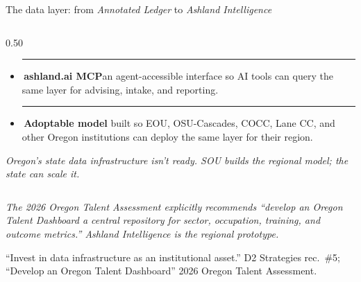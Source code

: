 \documentclass[aspectratio=169,11pt]{beamer}
\newcommand{\monoLabel}[1]{%
  {\ttfamily\fontsize{7.5pt}{9pt}\selectfont\color{textMuted}#1}%
}
\newcommand{\pdot}[1]{%
  {\color{#1}\rule[0.15ex]{0.55ex}{0.55ex}}%
}
\begin{document}
\begin{frame}{The data layer: from \emph{Annotated Ledger} to \emph{Ashland Intelligence}}
\begin{columns}[T,onlytextwidth]
\begin{column}{0.50\textwidth}
\begin{itemize}
              one schema; cites every source.
        \item \pdot{oil}\,\textbf{ashland.ai MCP}\;\textemdash{}\;an
              agent-accessible interface so AI tools can query the
              same layer for advising, intake, and reporting.
        \item \pdot{cSoredi}\,\textbf{Adoptable model}\;\textemdash{}\;
              built so EOU, OSU-Cascades, COCC, Lane CC, and other
              Oregon institutions can deploy the same layer for
              their region.
      \end{itemize}
      \vspace{4pt}
      \color{textSecondary}\itshape\fontsize{10pt}{13pt}\selectfont
      Oregon's state data infrastructure isn't ready. SOU builds
      the regional model; the state can scale it.
    \end{column}
  \end{columns}
  \vspace{2pt}\par
  \centering
  {\itshape\color{textSecondary}\fontsize{9.5pt}{12pt}\selectfont
   The 2026 Oregon Talent Assessment explicitly recommends
   ``develop an Oregon Talent Dashboard \textemdash{} a central
   repository for sector, occupation, training, and outcome
   metrics.'' Ashland Intelligence is the regional prototype.}\par
  \vspace{4pt}
  \monoLabel{``Invest in data infrastructure as an institutional asset.'' \textendash{} D2 Strategies rec.\ \#5; ``Develop an Oregon Talent Dashboard'' \textendash{} 2026 Oregon Talent Assessment.}
\end{frame}
\end{document}
